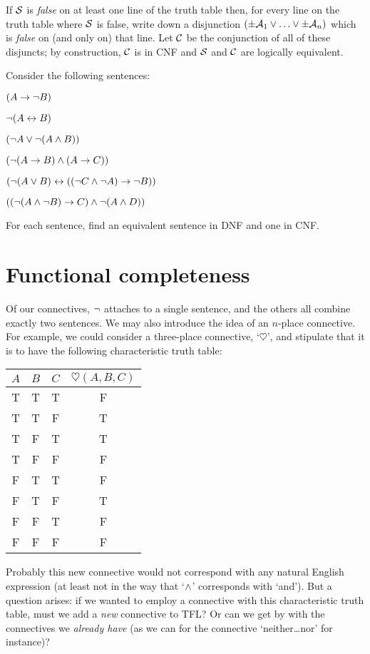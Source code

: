	If $\mathcal{S}$ is \emph{false} on at least one line of the truth table then, for every line on the truth table where $\mathcal{S}$ is false, write down a disjunction $(\pm\mathcal{A}_1 \vee \ldots \vee \pm\mathcal{A}_n)$ which is \emph{false} on (and only on) that line. Let $\mathcal{C}$ be the conjunction of all of these disjuncts; by construction, $\mathcal{C}$ is in CNF and $\mathcal{S}$ and $\mathcal{C}$ are logically equivalent.

\practiceproblems
\problempart
\label{pr.DNF}
Consider the following sentences:
	\begin{earg}
		\item $(A \rightarrow \neg B)$
		\item $\neg (A \leftrightarrow B)$
		\item $(\neg A \vee \neg (A \wedge B))$
		\item $(\neg (A \rightarrow B ) \wedge (A \rightarrow C))$
		\item $(\neg (A \vee B) \leftrightarrow ((\neg C \wedge \neg A) \rightarrow \neg B))$
		\item $((\neg (A \wedge \neg B) \rightarrow C) \wedge \neg (A \wedge D))$
	\end{earg}
        For each sentence, find an equivalent sentence in DNF and one in CNF.

\chapter{Functional completeness}\label{c:FunctionalCompleteness}

Of our connectives, $\neg$ attaches to a single sentence, and the others all combine exactly two sentences. We may also introduce the idea of an $n$-place connective. For example, we could consider a three-place connective, `$\heartsuit$', and stipulate that it is to have the following characteristic truth table:
\begin{center}
\begin{tabular}{c c c | c}
$A$ & $B$ & $C$ & $\heartsuit(A,B,C)$\\
\hline
 T & T & T & F \\
 T & T & F & T \\
 T & F & T & T \\
 T & F & F & F \\
 F & T & T & F \\
 F & T & F & T \\
 F & F & T & F \\
 F & F & F & F
\end{tabular}
\end{center}
Probably this new connective would not correspond with any natural English expression (at least not in the way that `$\wedge$' corresponds with `and'). But a question arises: if we wanted to employ a connective with this characteristic truth table, must we add a \emph{new} connective to TFL? Or can we get by with the connectives we \emph{already have} (as we can for the connective `neither\dots nor' for instance)?

